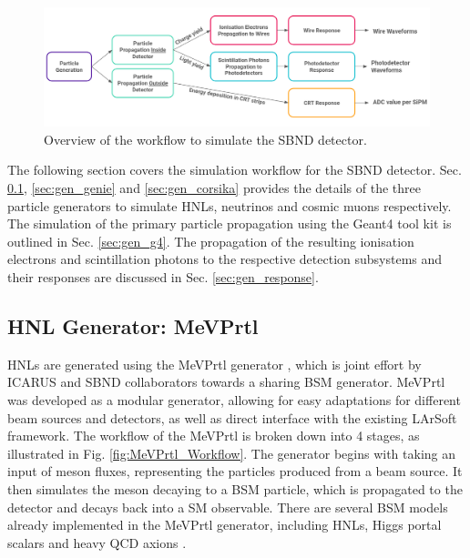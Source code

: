 \begin{figure}[htbp!] 
\centering    
\includegraphics[width=1.0\textwidth]{Sim_Workflow}
\caption[Sim_Workflow]{
Overview of the workflow to simulate the SBND detector.
}
\label{fig:Sim_Workflow}
\end{figure}

The following section covers the simulation workflow for the SBND detector.
Sec. \ref{sec:gen_mevprtl}, \ref{sec:gen_genie} and \ref{sec:gen_corsika} provides the details of the three particle generators to simulate HNLs, neutrinos and cosmic muons respectively.
The simulation of the primary particle propagation using the Geant4 tool kit is outlined in Sec. \ref{sec:gen_g4}.
The propagation of the resulting ionisation electrons and scintillation photons to the respective detection subsystems and their responses are discussed in Sec. \ref{sec:gen_response}. 


\subsection{HNL Generator: MeVPrtl}
\label{sec:gen_mevprtl}

HNLs are generated using the MeVPrtl generator \cite{}, which is joint effort by ICARUS and SBND collaborators towards a sharing BSM generator.
MeVPrtl was developed as a modular generator, allowing for easy adaptations for different beam sources and detectors, as well as direct interface with the existing LArSoft framework.
The workflow of the MeVPrtl is broken down into 4 stages, as illustrated in Fig. \ref{fig:MeVPrtl_Workflow}.
The generator begins with taking an input of meson fluxes, representing the particles produced from a beam source.
It then simulates the meson decaying to a BSM particle, which is propagated to the detector and decays back into a SM observable.
There are several BSM models already implemented in the MeVPrtl generator, including HNLs, Higgs portal scalars \cite{} and heavy QCD axions \cite{}.


